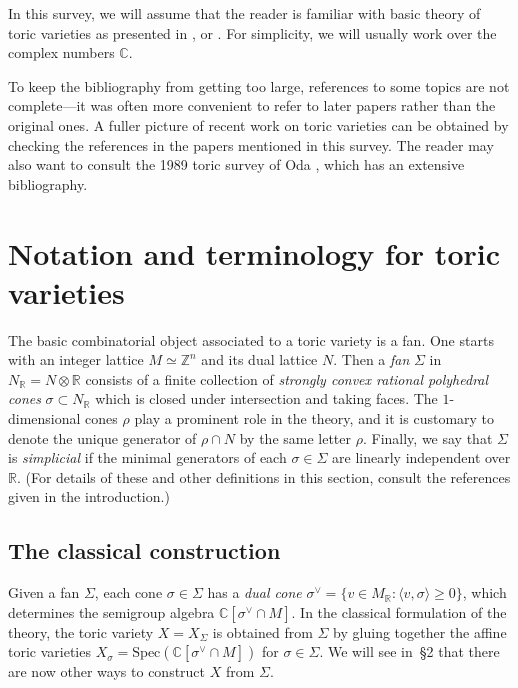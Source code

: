 \documentclass{amsart}
\theoremstyle{plain}
\theoremstyle{definition}
\begin{document}
	In this survey, we will assume that the reader is familiar
with basic theory of toric varieties as presented in \cite{Dan2},
\cite{Ful} or \cite{Oda2}.  For simplicity, we will usually work over
the complex numbers $\mathbb{C}$.  

	To keep the bibliography from getting too large, references to
some topics are not complete---it was often more convenient to refer
to later papers rather than the original ones.  A fuller picture of
recent work on toric varieties can be obtained by checking the
references in the papers mentioned in this survey.  The reader may
also want to consult the 1989 toric survey of Oda \cite{Oda3}, which
has an extensive bibliography.

\section{Notation and terminology for toric varieties}

	The basic combinatorial object associated to a toric variety
is a fan.  One starts with an integer lattice $M \simeq \mathbb{Z}^n$
and its dual lattice $N$.  Then a {\it fan\/} $\Sigma$ in $N_{\mathbb{R}} = N\otimes \mathbb{R}$ consists of a finite collection of {\it
strongly convex rational polyhedral cones\/} $\sigma \subset N_{\mathbb{R}}$ which is closed under intersection and taking faces.  The
$1$-dimensional cones $\rho$ play a prominent role in the theory, and
it is customary to denote the unique generator of $\rho\cap N$ by the
same letter $\rho$.  Finally, we say that $\Sigma$ is {\it
simplicial\/} if the minimal generators of each $\sigma \in \Sigma$
are linearly independent over $\mathbb{R}$.  (For details of these and
other definitions in this section, consult the references given in the
introduction.)

	\subsection{The classical construction} Given a fan
$\Sigma$, each cone $\sigma \in \Sigma$ has a {\it dual
cone\/} $\sigma^\vee = \{v \in M_{\mathbb{R}}: \langle v,\sigma\rangle
\ge 0\}$, which determines the semigroup algebra
$\mathbb{C}[\sigma^\vee\cap M]$.  In the classical formulation of the
theory, the toric variety $X = X_\Sigma$ is obtained from $\Sigma$ by
gluing together the affine toric varieties $X_\sigma =
\mathrm{Spec}(\mathbb{C}[\sigma^\vee\cap M])$ for $\sigma \in \Sigma$.
We will see in~\S2 that there are now other ways to construct $X$ from
$\Sigma$.
\end{document}
